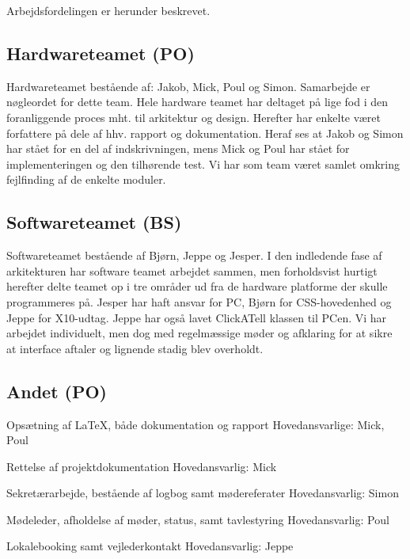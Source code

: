 Arbejdsfordelingen er herunder beskrevet. 

\subsection{Hardwareteamet (PO)} 
Hardwareteamet bestående af: Jakob, Mick, Poul og Simon. Samarbejde er nøgleordet for dette team.
Hele hardware teamet har deltaget på lige fod i den foranliggende proces mht. til arkitektur og design. Herefter har enkelte været forfattere på dele af hhv. rapport og dokumentation. Heraf ses at Jakob og Simon har stået for en del af indskrivningen, mens Mick og Poul har stået for implementeringen og den tilhørende test.
Vi har som team været samlet omkring fejlfinding af de enkelte moduler.  

\subsection{Softwareteamet (BS)}
Softwareteamet bestående af Bjørn, Jeppe og Jesper.
I den indledende fase af arkitekturen har software teamet arbejdet sammen, men forholdsvist hurtigt herefter delte teamet op i tre områder ud fra de hardware platforme der skulle programmeres på. Jesper har haft ansvar for PC, Bjørn for CSS-hovedenhed og Jeppe for X10-udtag. Jeppe har også lavet ClickATell klassen til PCen. Vi har arbejdet individuelt, men dog med regelmæssige møder og afklaring for at sikre at interface aftaler og lignende stadig blev overholdt.


\subsection{Andet (PO)}

Opsætning af \LaTeX, både dokumentation og rapport \newline
Hovedansvarlige: Mick, Poul 

Rettelse af projektdokumentation
Hovedansvarlig: Mick

Sekretærarbejde, bestående af logbog samt mødereferater \newline
Hovedansvarlig: Simon

Mødeleder, afholdelse af møder, status, samt tavlestyring \newline
Hovedansvarlig: Poul

Lokalebooking samt vejlederkontakt \newline
Hovedansvarlig: Jeppe